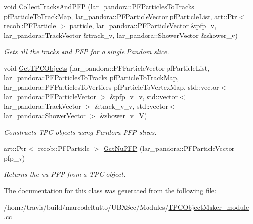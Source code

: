 \begin{DoxyCompactItemize}
\item 
void \hyperlink{group__UBXSec_ga0550ab0459c2d42ff81eb349d4b4151a}{\-Collect\-Tracks\-And\-P\-F\-P} (lar\-\_\-pandora\-::\-P\-F\-Particles\-To\-Tracks pf\-Particle\-To\-Track\-Map, lar\-\_\-pandora\-::\-P\-F\-Particle\-Vector pf\-Particle\-List, art\-::\-Ptr$<$ recob\-::\-P\-F\-Particle $>$ particle, lar\-\_\-pandora\-::\-P\-F\-Particle\-Vector \&pfp\-\_\-v, lar\-\_\-pandora\-::\-Track\-Vector \&track\-\_\-v, lar\-\_\-pandora\-::\-Shower\-Vector \&shower\-\_\-v)
\begin{DoxyCompactList}\small\item\em \-Gets all the tracks and \-P\-F\-P for a single \-Pandora slice. \end{DoxyCompactList}\item 
void \hyperlink{group__UBXSec_ga3a6d9a4eca7f0c83bb118e01f5a00505}{\-Get\-T\-P\-C\-Objects} (lar\-\_\-pandora\-::\-P\-F\-Particle\-Vector pf\-Particle\-List, lar\-\_\-pandora\-::\-P\-F\-Particles\-To\-Tracks pf\-Particle\-To\-Track\-Map, lar\-\_\-pandora\-::\-P\-F\-Particles\-To\-Vertices pf\-Particle\-To\-Vertex\-Map, std\-::vector$<$ lar\-\_\-pandora\-::\-P\-F\-Particle\-Vector $>$ \&pfp\-\_\-v\-\_\-v, std\-::vector$<$ lar\-\_\-pandora\-::\-Track\-Vector $>$ \&track\-\_\-v\-\_\-v, std\-::vector$<$ lar\-\_\-pandora\-::\-Shower\-Vector $>$ \&shower\-\_\-v\-\_\-\-V)
\begin{DoxyCompactList}\small\item\em \-Constructs \-T\-P\-C objects using \-Pandora \-P\-F\-P slices. \end{DoxyCompactList}\item 
art\-::\-Ptr$<$ recob\-::\-P\-F\-Particle $>$ \hyperlink{group__UBXSec_ga6a47470b5f5690a3626e14bc9f6f360c}{\-Get\-Nu\-P\-F\-P} (lar\-\_\-pandora\-::\-P\-F\-Particle\-Vector pfp\-\_\-v)
\begin{DoxyCompactList}\small\item\em \-Returns the nu \-P\-F\-P from a \-T\-P\-C object. \end{DoxyCompactList}\end{DoxyCompactItemize}


\-The documentation for this class was generated from the following file\-:\begin{DoxyCompactItemize}
\item 
/home/travis/build/marcodeltutto/\-U\-B\-X\-Sec/\-Modules/\hyperlink{TPCObjectMaker__module_8cc}{\-T\-P\-C\-Object\-Maker\-\_\-module.\-cc}\end{DoxyCompactItemize}
